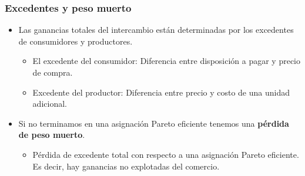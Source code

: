 \documentclass{beamer}
\begin{document}
\begin{frame}
\frametitle{Excedentes y peso muerto}
\begin{itemize}
    \item Las ganancias totales del intercambio están determinadas por los excedentes de consumidores y productores.
    \begin{itemize}
        \item El excedente del consumidor: Diferencia entre disposición a pagar y precio de compra.  
        \item Excedente del productor: Diferencia entre precio y costo de una unidad adicional. \vspace{2mm}
    \end{itemize}
    \item Si no terminamos en una asignación Pareto eficiente tenemos una \textbf{pérdida de peso muerto}.
    \begin{itemize}
        \item Pérdida de excedente total con respecto a una asignación Pareto eficiente. Es decir, hay ganancias no explotadas del comercio.
    \end{itemize}
    \end{itemize}
\end{frame}


\end{document}
